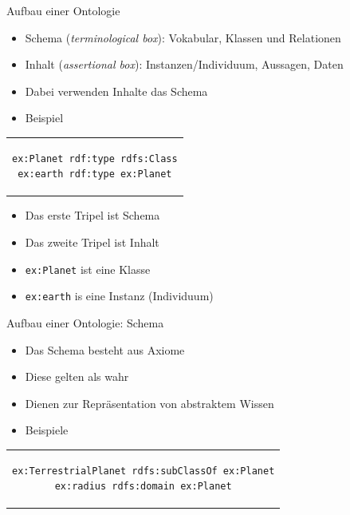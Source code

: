 \documentclass{beamer}
\begin{document}
\begin{frame}[fragile]{Aufbau einer Ontologie}

	\begin{itemize}
		\item Schema (\emph{terminological box}): Vokabular, Klassen und Relationen
		\item Inhalt (\emph{assertional box}): Instanzen/Individuum, Aussagen, Daten 
		\item Dabei verwenden Inhalte das Schema
		\item Beispiel
	\end{itemize}	
	
    \begin{center}
    	\begin{tabular}{c}
    		\begin{lstlisting}
ex:Planet rdf:type rdfs:Class
ex:earth rdf:type ex:Planet
    		\end{lstlisting}
    	\end{tabular}
    \end{center}
    
	\begin{itemize}
		\item Das erste Tripel ist Schema
		\item Das zweite Tripel ist Inhalt
		\item \texttt{ex:Planet} ist eine Klasse
		\item \texttt{ex:earth} is eine Instanz (Individuum)
	\end{itemize}	
	
\end{frame}

\begin{frame}[fragile]{Aufbau einer Ontologie: Schema}
	
	\begin{itemize}
		\item Das Schema besteht aus Axiome
		\item Diese gelten als wahr
		\item Dienen zur Repräsentation von abstraktem Wissen
		\item Beispiele
	\end{itemize}	
	
	\begin{center}
		\begin{tabular}{c}
			\begin{lstlisting}
ex:TerrestrialPlanet rdfs:subClassOf ex:Planet
ex:radius rdfs:domain ex:Planet
			\end{lstlisting}
		\end{tabular}
	\end{center}	
	
\end{frame}
\end{document}
